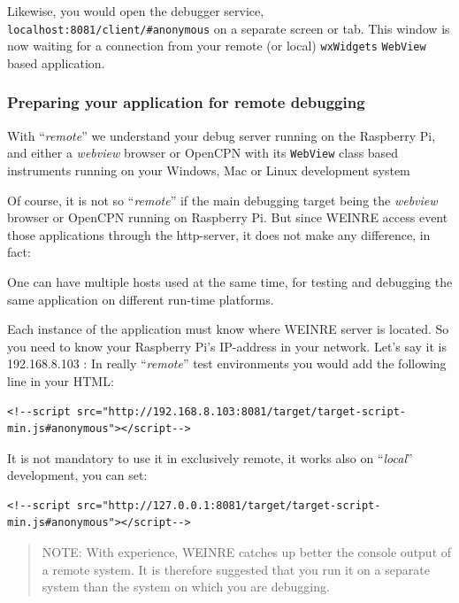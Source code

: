 \documentclass[11pt]{article}
\begin{document}
    Likewise, you would open the debugger service,
\texttt{localhost:8081/client/\#anonymous} on a separate screen or tab.
This window is now waiting for a connection from your remote (or local)
\texttt{wxWidgets} \texttt{WebView} based application.

    \hypertarget{preparing-your-application-for-remote-debugging}{%
\subsubsection{Preparing your application for remote
debugging}\label{preparing-your-application-for-remote-debugging}}

    With ``\emph{remote}'' we understand your debug server running on the
Raspberry Pi, and either a \emph{webview} browser or OpenCPN with its
\texttt{WebView} class based instruments running on your Windows, Mac or
Linux development system

    Of course, it is not so ``\emph{remote}'' if the main debugging target
being the \emph{webview} browser or OpenCPN running on Raspberry Pi. But
since WEINRE access event those applications through the http-server, it
does not make any difference, in fact:

    One can have multiple hosts used at the same time, for testing and
debugging the same application on different run-time platforms.

    Each instance of the application must know where WEINRE server is
located. So you need to know your Raspberry Pi's IP-address in your
network. Let's say it is 192.168.8.103 : In really ``\emph{remote}''
test environments you would add the following line in your HTML:

    \begin{verbatim}
<!--script src="http://192.168.8.103:8081/target/target-script-min.js#anonymous"></script-->
\end{verbatim}

    It is not mandatory to use it in exclusively remote, it works also on
``\emph{local}'' development, you can set:

    \begin{verbatim}
<!--script src="http://127.0.0.1:8081/target/target-script-min.js#anonymous"></script-->
\end{verbatim}

    \begin{quote}
NOTE: With experience, WEINRE catches up better the console output of a
remote system. It is therefore suggested that you run it on a separate
system than the system on which you are debugging.
\end{quote}
\end{document}
